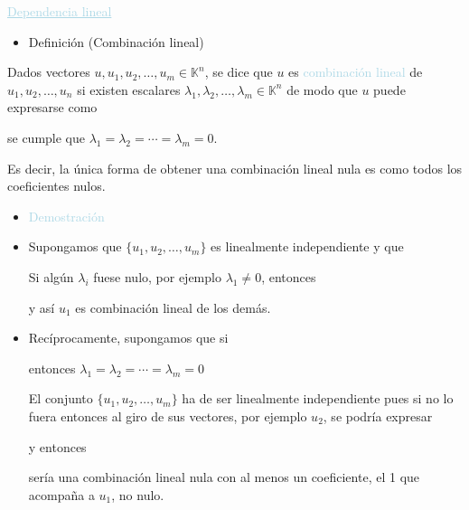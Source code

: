 \documentclass[12pt]{article}
\begin{document}
\textcolor{lightblue}{\underline{Dependencia lineal}}
\begin{itemize}[label=\color{red}\textbullet, leftmargin=*]
    \item \color{lightblue}Definición (Combinación lineal)
\end{itemize}
Dados vectores $u,u_1,u_2,\hdots,u_m\in\mathbb{K}^n$, se dice
que $u$ es \textcolor{lightblue}{combinación lineal} de
$u_1,u_2,\hdots,u_n$ si existen escalares
$\lambda_1,\lambda_2,\hdots,\lambda_m\in\mathbb{K}^n$ de modo
que $u$ puede expresarse como
\begin{center}
\end{center}
se cumple que $\lambda_1=\lambda_2=\cdots=\lambda_m=0$.

Es decir, la única forma de obtener una combinación lineal nula
es como todos los coeficientes nulos.
\begin{itemize}[label=\color{red}\textbullet]
    \item \textcolor{lightblue}{Demostración}
\end{itemize}
\begin{itemize}[label=$\longrightarrow$]
\item Supongamos que $\{u_1,u_2,\hdots,u_m\}$ es linealmente
independiente y que


Si algún $\lambda_i$ fuese nulo, por ejemplo $\lambda_1\neq0$,
entonces


          y así $u_1$ es combinación lineal de los demás.

    \item Recíprocamente, supongamos que si


          entonces $\lambda_1=\lambda_2=\cdots=\lambda_m=0$

El conjunto $\{u_1,u_2,\hdots,u_m\}$ ha de ser linealmente
independiente pues si no lo fuera entonces al giro de sus
vectores, por ejemplo $u_2$, se podría expresar


          y entonces


sería una combinación lineal nula con al menos un coeficiente,
el 1 que acompaña a $u_1$, no nulo.
\end{itemize}
\end{document}
